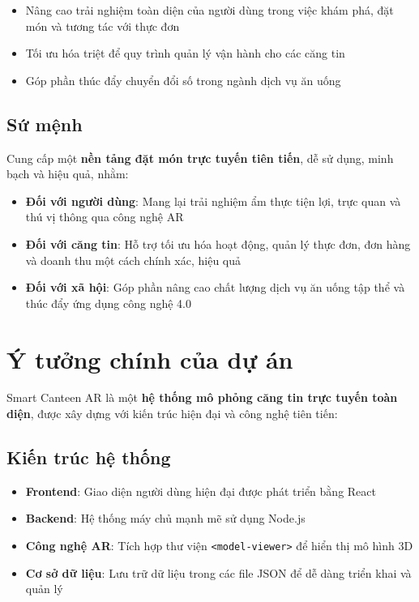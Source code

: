 \documentclass[12pt,a4paper]{article}
\begin{document}
\begin{itemize}[leftmargin=1cm]
    \item Nâng cao trải nghiệm toàn diện của người dùng trong việc khám phá, đặt món và tương tác với thực đơn
    \item Tối ưu hóa triệt để quy trình quản lý vận hành cho các căng tin
    \item Góp phần thúc đẩy chuyển đổi số trong ngành dịch vụ ăn uống
\end{itemize}

\subsection{Sứ mệnh}
Cung cấp một \textbf{nền tảng đặt món trực tuyến tiên tiến}, dễ sử dụng, minh bạch và hiệu quả, nhằm:

\begin{itemize}[leftmargin=1cm]
    \item \textbf{Đối với người dùng}: Mang lại trải nghiệm ẩm thực tiện lợi, trực quan và thú vị thông qua công nghệ AR
    \item \textbf{Đối với căng tin}: Hỗ trợ tối ưu hóa hoạt động, quản lý thực đơn, đơn hàng và doanh thu một cách chính xác, hiệu quả
    \item \textbf{Đối với xã hội}: Góp phần nâng cao chất lượng dịch vụ ăn uống tập thể và thúc đẩy ứng dụng công nghệ 4.0
\end{itemize}

\section{Ý tưởng chính của dự án}

Smart Canteen AR là một \textbf{hệ thống mô phỏng căng tin trực tuyến toàn diện}, được xây dựng với kiến trúc hiện đại và công nghệ tiên tiến:

\subsection{Kiến trúc hệ thống}
\begin{itemize}[leftmargin=1cm]
    \item \textbf{Frontend}: Giao diện người dùng hiện đại được phát triển bằng React
    \item \textbf{Backend}: Hệ thống máy chủ mạnh mẽ sử dụng Node.js
    \item \textbf{Công nghệ AR}: Tích hợp thư viện \texttt{<model-viewer>} để hiển thị mô hình 3D
    \item \textbf{Cơ sở dữ liệu}: Lưu trữ dữ liệu trong các file JSON để dễ dàng triển khai và quản lý
\end{itemize}
\end{document}

